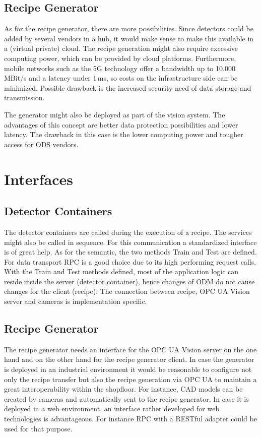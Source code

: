 \subsection{Recipe Generator}
As for the recipe generator, there are more possibilities. Since detectors could be added by several vendors in a hub, it would make sense to make this available in a (virtual private) cloud. The recipe generation might also require excessive computing power, which can be provided by cloud platforms. Furthermore, mobile networks such as the 5G technology offer a bandwidth up to 10.000\,MBit/s and a latency under 1\,ms, so costs on the infrastructure side can be minimized. Possible drawback is the increased security need of data storage and transmission.

The generator might also be deployed as part of the vision system. The advantages of this concept are better data protection possibilities and lower latency. The drawback in this case is the lower computing power and tougher access for ODS vendors.

\section{Interfaces}
\subsection{Detector Containers}
The detector containers are called during the execution of a recipe. The services might also be called in sequence. For this communication a standardized interface is of great help. As for the semantic, the two methods Train and Test are defined. For data transport RPC is a good choice due to its high performing request calls. With the Train and Test methods defined, most of the application logic can reside inside the server (detector container), hence changes of ODM do not cause changes for the client (recipe). The connection between recipe, OPC UA Vision server and cameras is implementation specific.\\

\subsection{Recipe Generator}
The recipe generator needs an interface for the OPC UA Vision server on the one hand and on the other hand for the recipe generator client. In case the generator is deployed in an industrial environment it would be reasonable to configure not only the recipe transfer but also the recipe generation via OPC UA to maintain a great interoperability within the shopfloor. For instance, CAD models can be created by cameras and automatically sent to the recipe generator. In case it is deployed in a web environment, an interface rather developed for web technologies is advantageous. For instance RPC with a RESTful adapter could be used for that purpose.


